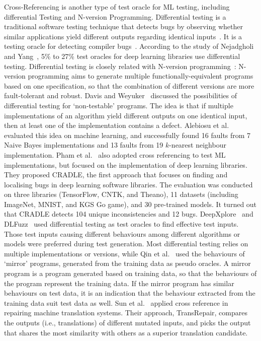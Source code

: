 \label{sec:oracle_differential}
Cross-Referencing is another type of test oracle for ML testing, including differential Testing and N-version Programming.
Differential testing is a traditional software testing technique that detects bugs by observing whether similar applications yield different outputs regarding identical inputs~.
It is a testing oracle for detecting compiler bugs~.
According to the study of Nejadgholi and Yang~, 5\% to 27\% test oracles for deep learning libraries use differential testing.
Differential testing is closely related with N-version programming~: N-version programming aims to generate multiple functionally-equivalent programs based on one specification, so that the combination of different versions are more fault-tolerant and robust.
Davis and Weyuker~ discussed the possibilities of differential testing for `non-testable' programs. 
The idea is that if multiple implementations of an algorithm yield different outputs on one identical input, then at least one of the implementation contains a defect.
Alebiosu et al.~ evaluated this idea on machine learning, and successfully found 16 faults from 7 Naive Bayes implementations and 13 faults from 19 $k$-nearest neighbour implementation.
Pham et al.~ also adopted cross referencing to test ML implementations, but focused on the implementation of deep learning libraries.
They proposed CRADLE, the first approach that focuses on finding and localising bugs in deep learning software libraries. The evaluation was conducted on three libraries (TensorFlow, CNTK, and Theano), 11 datasets (including ImageNet, MNIST, and KGS Go game), and 30 pre-trained models. It turned out that CRADLE detects 104 unique inconsistencies and 12 bugs.
DeepXplore~ and DLFuzz~ used differential testing as test oracles to find effective test inputs. Those test inputs causing different behaviours among different algorithms or models were preferred during test generation. 
Most differential testing relies on multiple implementations or versions, while 
Qin et al.~ used the behaviours of `mirror' programs, generated from the training data as pseudo oracles.
A mirror program is a program generated based on training data, so that the behaviours of the program represent the training data.
If the mirror program has similar behaviours on test data, it is an indication that the behaviour extracted from the training data suit test data as well.
Sun et al.~ applied cross reference in repairing machine translation systems.
Their approach, TransRepair, compares the outputs (i.e., translations) of different mutated inputs, and picks the output that shares the most similarity with others as a superior translation candidate.

